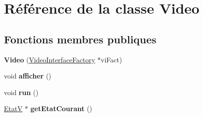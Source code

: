 \hypertarget{classVideo}{\section{Référence de la classe Video}
\label{classVideo}
}
\subsection*{Fonctions membres publiques}
\begin{DoxyCompactItemize}
\item 
\hypertarget{classVideo_a54f940a5f19f6bf69ea67fdf62ec8b9c}{{\bfseries Video} (\hyperlink{classVideoInterfaceFactory}{Video\+Interface\+Factory} $\ast$vi\+Fact)}\label{classVideo_a54f940a5f19f6bf69ea67fdf62ec8b9c}

\item 
\hypertarget{classVideo_a787b7cb0faa1c1879b8709247c1efff9}{void {\bfseries afficher} ()}\label{classVideo_a787b7cb0faa1c1879b8709247c1efff9}

\item 
\hypertarget{classVideo_a88d85260aae83f3a57c5ead9eda23b6b}{void {\bfseries run} ()}\label{classVideo_a88d85260aae83f3a57c5ead9eda23b6b}

\item 
\hypertarget{classVideo_a5255a0a2f36b0152e9065743a54fadec}{\hyperlink{classEtatV}{Etat\+V} $\ast$ {\bfseries get\+Etat\+Courant} ()}\label{classVideo_a5255a0a2f36b0152e9065743a54fadec}


\end{DoxyCompactItemize}
